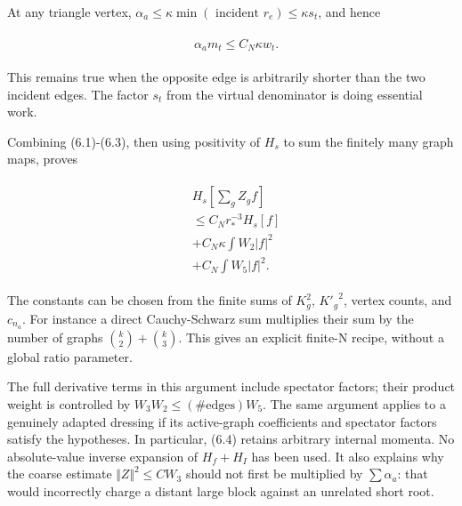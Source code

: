 At any triangle vertex,
\(\alpha _{a}\le \kappa  \min (\text{ incident } r_{e})\le \kappa  s_{t}\),
and hence

\begin{gather*}
\begin{aligned}
& \alpha _{a} m_{t} \le  C_{N} \kappa  w_{t}.
\end{aligned}\tag{6.3}
\end{gather*}

This remains true when the opposite edge is arbitrarily shorter than the
two incident edges. The factor \(s_{t}\) from the virtual denominator is
doing essential work.

Combining (6.1)-(6.3), then using positivity of \(H_{s}\) to sum the
finitely many graph maps, proves

\begin{gather*}
\begin{aligned}
& H_{s}[\sum _{g} Z_{g} f] \\
& \le  C_{N} r_{*}^{-3} H_{s}[f] \\
& + C_{N} \kappa  \int  W_{2} \vert f\vert ^{2} \\
& + C_{N} \int  W_{5} \vert f\vert ^{2}.
\end{aligned}\tag{6.4}
\end{gather*}

The constants can be chosen from the finite sums of \(K_{g}^{2}\),
\({K'_{g}}^{2}\), vertex counts, and \(c_{n_{a}}\). For instance a
direct Cauchy-Schwarz sum multiplies their sum by the number of graphs
\(\binom{k}{2}+\binom{k}{3}\). This gives an explicit finite-N recipe,
without a global ratio parameter.

The full derivative terms in this argument include spectator factors;
their product weight is controlled by
\(W_{3} W_{2} \le  (\#\text{edges}) W_{5}\). The same argument applies
to a genuinely adapted dressing if its active-graph coefficients and
spectator factors satisfy the hypotheses. In particular, (6.4) retains
arbitrary internal momenta. No absolute-value inverse expansion of
\(H_{f}+H_{I}\) has been used. It also explains why the coarse estimate
\(\Vert Z\Vert ^{2}\le C W_{3}\) should not first be multiplied by
\(\sum  \alpha _{a}\): that would incorrectly charge a distant large
block against an unrelated short root.

